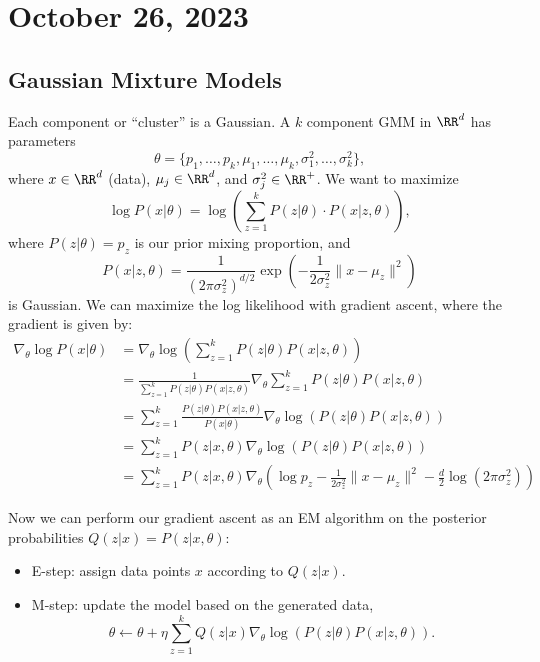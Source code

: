 \section{October 26, 2023}

\subsection{Gaussian Mixture Models}

Each component or ``cluster'' is a Gaussian. A $k$ component GMM in $\RR^d$ has parameters 
\[\theta=\{p_1, \hdots, p_k, \mu_1, \hdots, \mu_k, \sigma_1^2, \hdots, \sigma_k^2\},\]where $x\in \RR^d$ (data), $\mu_j\in \RR^d$, and $\sigma_j^2 \in \RR^+$. We want to maximize 
\[\log P(x|\theta) = \log\left(\sum_{z=1}^k P(z|\theta)\cdot P(x|z,\theta)\right),\]
where $P(z|\theta) = p_z$ is our prior mixing proportion, and 
\[P(x|z,\theta) = \frac{1}{(2\pi \sigma_z^2)^{d/2}}\exp\left(-\frac{1}{2\sigma_z^2}\lVert x-\mu_z\rVert^2\right)\] 
is Gaussian. We can maximize the log likelihood with gradient ascent, where the gradient is given by:
\begin{align*}
	\nabla_{\theta}\log P(x|\theta) &= \nabla_{\theta}\log\left(\sum_{z=1}^k P(z|\theta)P(x|z,\theta)\right) \\
																	&= \frac{1}{\sum_{z=1}^k P(z|\theta)P(x|z,\theta)}\nabla_{\theta}\sum_{z=1}^k P(z|\theta)P(x|z,\theta) \\
																	&= \sum_{z=1}^k\frac{P(z|\theta)P(x|z,\theta)}{P(x|\theta)} \nabla_{\theta}\log\left(P(z|\theta)P(x|z,\theta)\right) \\
																	&= \sum_{z=1}^k P(z|x,\theta)\nabla_{\theta}\log\left(P(z|\theta)P(x|z,\theta)\right) \\
																	&= \sum_{z=1}^k P(z|x,\theta)\nabla_{\theta} \left(\log p_z - \frac{1}{2\sigma_z^2}\lVert x-\mu_z\rVert^2 - \frac{d}{2}\log(2\pi \sigma_z^2)\right)
\end{align*}

Now we can perform our gradient ascent as an EM algorithm on the posterior probabilities $Q(z|x) = P(z|x,\theta)$:
\begin{itemize}
	\item E-step: assign data points $x$ according to $Q(z|x)$. 
	\item M-step: update the model based on the generated data, 
		\[\theta \leftarrow \theta + \eta \sum_{z=1}^kQ(z|x)\nabla_{\theta}\log\left(P(z|\theta)P(x|z,\theta)\right). \] 
\end{itemize}

